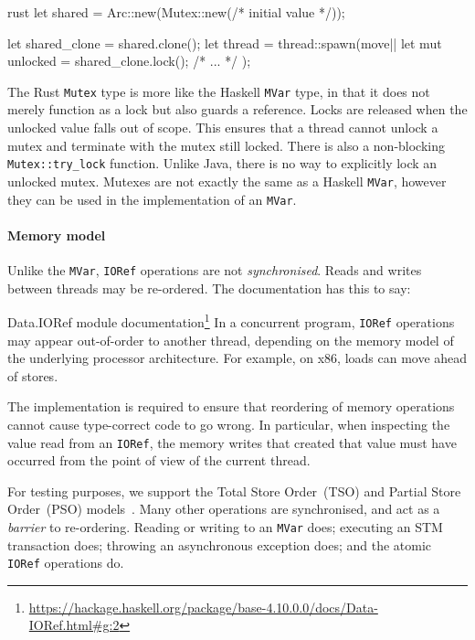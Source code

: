 \begin{listing}
\centering
\begin{cminted}{rust}
let shared = Arc::new(Mutex::new(/* initial value */));

let shared_clone = shared.clone();
let thread = thread::spawn(move|| {
    let mut unlocked = shared_clone.lock();
    /* ... */
});
\end{cminted}
\caption{Mutual exclusion in Rust.}\label{lst:mute_rust}
\end{listing}

The Rust \verb|Mutex| type is more like the Haskell \verb|MVar| type,
in that it does not merely function as a lock but also guards a
reference.  Locks are released when the unlocked value falls out of
scope.  This ensures that a thread cannot unlock a mutex and terminate
with the mutex still locked.  There is also a non-blocking
\verb|Mutex::try_lock| function.  Unlike Java, there is no way to
explicitly lock an unlocked mutex.  Mutexes are not exactly the same
as a Haskell \verb|MVar|, however they can be used in the
implementation of an \verb|MVar|.

\paragraph{Memory model}
Unlike the \verb|MVar|, \verb|IORef| operations are not
\emph{synchronised}.  Reads and writes between threads may be
re-ordered.  The documentation has this to say:

\begin{bquote}{Data.IORef module documentation\footnote{\url{https://hackage.haskell.org/package/base-4.10.0.0/docs/Data-IORef.html\#g:2}}}
  In a concurrent program, \verb|IORef| operations may appear out-of-order to
  another thread, depending on the memory model of the underlying processor
  architecture.  For example, on x86, loads can move ahead of stores.

  The implementation is required to ensure that reordering of memory operations
  cannot cause type-correct code to go wrong.  In particular, when inspecting
  the value read from an \verb|IORef|, the memory writes that created that value
  must have occurred from the point of view of the current thread.
\end{bquote}

For testing purposes, we support the Total Store Order~(TSO) and Partial Store
Order~(PSO) models~.  Many other operations are
synchronised, and act as a \emph{barrier} to re-ordering.  Reading or writing to
an \verb|MVar| does; executing an STM transaction does; throwing an asynchronous
exception does; and the atomic \verb|IORef| operations do.

